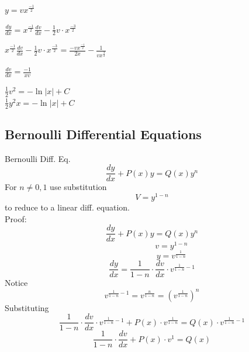\documentclass[12pt]{article}
\numberwithin{equation}{subsection}
\newcommand{\absp}[1]{\left\vert #1 \right\vert}
\newcommand{\derx}[1]{\frac{d #1}{dx}}
\newcommand{\deryx}{\frac{dy}{dx}}
\newcommand{\indb}{\hspace{1cm}}
\newcommand{\indd}{\hspace{2cm}}
\newcommand{\indg}{\hspace{3.5cm}}
\begin{document}
\indg $y=vx^{\frac{-1}{2}}$

\indg $\deryx= x^{\frac{-1}{2}} \derx{v}-\frac{1}{2} v \cdot x^{\frac{-3}{2}} $

\indd $\displaystyle x^{\frac{-1}{2}} \derx{v}-\frac{1}{2} v \cdot x^{\frac{-3}{2}} = \frac{-vx^{\frac{-1}{2}}}{2x}-\frac{1}{vx^{\frac{3}{2}}}$

\indd $\displaystyle \derx{v}=\frac{-1}{xv}$
 
\indd $\frac{1}{2} v^2 = - \ln \absp{x} +C $\\

\indd $\frac{1}{2}y^2x= - \ln \absp{x} +C$

\newpage

\subsection{Bernoulli Differential Equations}
Bernoulli Diff. Eq.
\begin{equation}
\deryx + P(x)y=Q(x)y^n
\end{equation}
For $n \neq 0, 1$ use substitution
\begin{equation}
V=y^{1-n}
\end{equation}
to reduce to a linear diff. equation.\\

Proof:
\begin{equation}
\deryx + P(x)y=Q(x)y^n \tag{1.8.1}
\end{equation}
\begin{equation}
\hspace{2cm} v=y^{1-n} \tag{1.8.2}
\end{equation}
\begin{equation}
\hspace{2cm} y=v^{\frac{1}{1-n}}
\end{equation}
\begin{equation}
\deryx = \frac{1}{1-n} \cdot  \derx{v} \cdot v^{\frac{1}{1-n}-1}
\end{equation}
\indb Notice
\begin{equation}
v^{\frac{1}{1-n}-1}=v^{\frac{n}{1-n}}=\left(v^{\frac{1}{1-n}}\right)^n
\end{equation}
\indb Substituting
\begin{equation}
\frac{1}{1-n} \cdot  \derx{v} \cdot v^{\frac{1}{1-n}-1} + P(x)\cdot v^{\frac{1}{1-n}} = Q(x) \cdot v^{\frac{1}{1-n}-1}
\end{equation}
\begin{equation}
\frac{1}{1-n} \cdot  \derx{v} + P(x)\cdot v^{1} = Q(x) 
\end{equation}
\end{document}
